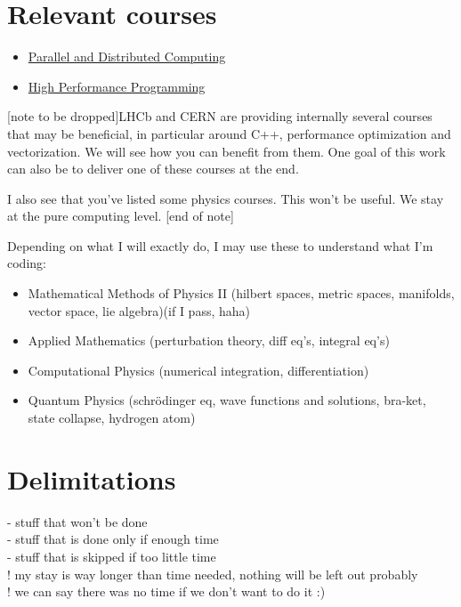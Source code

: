 \documentclass[12pt]{article}
\begin{document}
	\section{Relevant courses}
	
	\begin{itemize}
		\item \href{http://www.uu.se/en/admissions/master/selma/kursplan/?kpid=31898&type=1}
			{Parallel and Distributed Computing}
		
		\item \href{http://www.uu.se/en/admissions/master/selma/kursplan/?kpid=31897&lasar=18%2F19&typ=1}
			{High Performance Programming}	
	\end{itemize}

        \color{blue}
              [note to be dropped]LHCb and CERN are providing internally several courses that may be beneficial, in particular around C++, performance optimization and vectorization. We will see how you can benefit from them. One goal of this work can also be to deliver one of these courses at the end.

              I also see that you've listed some physics courses. This won't be useful. We stay at the pure computing level.
              [end of note]
        \color{black}
        
	Depending on what I will exactly do, I may use these to understand what I'm coding:
	\begin{itemize}
		\item Mathematical Methods of Physics II (hilbert spaces, metric spaces, manifolds, vector space, lie algebra)(if I pass, haha)
		\item Applied Mathematics (perturbation theory, diff eq's, integral eq's)
		\item Computational Physics (numerical integration, differentiation)
		\item Quantum Physics (schrödinger eq, wave functions and solutions, bra-ket, state collapse, hydrogen atom)
	\end{itemize}
	
	
	
	\section{Delimitations}

	\color{red}
	- stuff that won't be done\\
	- stuff that is done only if enough time\\
	- stuff that is skipped if too little time \\
	! my stay is way longer than time needed, nothing will be left out probably\\
	! we can say there was no time if we don't want to do it :) \\
	\color{black}
	
\end{document}
